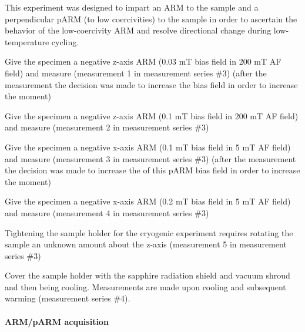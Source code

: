 \documentclass{article}
\begin{document}
    This experiment was designed to impart an ARM to the sample and a
perpendicular pARM (to low coercivities) to the sample in order to
ascertain the behavior of the low-coercivity ARM and resolve directional
change during low-temperature cycling.

Give the specimen a negative z-axis ARM (0.03 mT bias field in 200 mT AF
field) and measure (measurement 1 in measurement series \#3) (after the
measurement the decision was made to increase the bias field in order to
increase the moment)

Give the specimen a negative z-axis ARM (0.1 mT bias field in 200 mT AF
field) and measure (measurement 2 in measurement series \#3)

Give the specimen a negative x-axis ARM (0.1 mT bias field in 5 mT AF
field) and measure (measurement 3 in measurement series \#3) (after the
measurement the decision was made to increase the of this pARM bias
field in order to increase the moment)

Give the specimen a negative x-axis ARM (0.2 mT bias field in 5 mT AF
field) and measure (measurement 4 in measurement series \#3)

Tightening the sample holder for the cryogenic experiment requires
rotating the sample an unknown amount about the z-axis (measurement 5 in
measurement series \#3)

Cover the sample holder with the sapphire radiation shield and vacuum
shroud and then being cooling. Measurements are made upon cooling and
subsequent warming (measurement series \#4).


    \paragraph{ARM/pARM acquisition}
\end{document}

